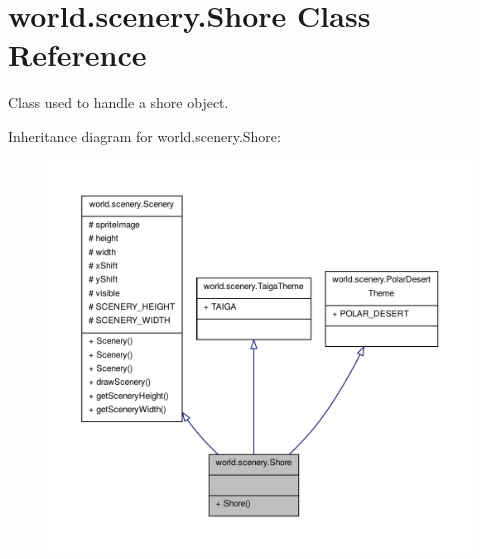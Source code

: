 \hypertarget{classworld_1_1scenery_1_1_shore}{\section{world.\-scenery.\-Shore Class Reference}
\label{classworld_1_1scenery_1_1_shore}
}


Class used to handle a shore object.  




Inheritance diagram for world.\-scenery.\-Shore\-:
\nopagebreak
\begin{figure}[H]
\begin{center}
\leavevmode
\includegraphics[width=350pt]{classworld_1_1scenery_1_1_shore__inherit__graph}
\end{center}
\end{figure}


